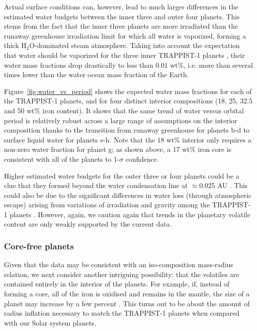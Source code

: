\documentclass[twocolumn]{aastex63}
\begin{document}
Actual surface conditions can, however, lead to much larger differences in the estimated water budgets between the inner three and outer four planets. This stems from the fact that the inner three planets are more irradiated than the runaway greenhouse irradiation limit \citep{Kopparapu2013,Wolf2017,Turbet2018} for which all water is vaporized, forming a thick H$_2$O-dominated steam atmosphere. Taking into account the expectation that water should be vaporized for the three inner TRAPPIST-1 planets \citep{Turbet2019,Turbet2020}, their water mass fractions drop drastically to less than $0.01$ wt\%, i.e. more than several times lower than the water ocean mass fraction of the Earth.

Figure~\ref{fig:water_vs_period} shows the expected water mass fractions for each of the TRAPPIST-1 planets, and for four distinct interior compositions (18, 25, 32.5 and 50 wt\% iron content). It shows that the same trend of water versus orbital period is relatively robust across a large range of assumptions on the interior composition thanks to the transition from runaway greenhouse for planets b-d to surface liquid water for planets e-h.  Note that the 18 wt\% interior only requires a non-zero water fraction for planet g;  as shown above, a 17 wt\% iron core is consistent with all of the planets to 1-$\sigma$ confidence.

Higher estimated water budgets for the outer three or four planets could be a clue that they formed beyond the water condensation line at $\approx$0.025 AU \citep{Unterborn2018a}. This could also be due to the significant differences in water loss (through atmospheric escape) arising from variations of irradiation and gravity among the TRAPPIST-1 planets \citep{Lissauer2007, Bolmont2017,Bourrier2017}.  However, again, we caution again that trends in the planetary volatile content are only weakly supported by the current data.

\subsubsection{Core-free planets} \label{sec:core_free}

Given that the data may be consistent with an iso-composition mass-radius relation, we next consider another intriguing possibility:
that the volatiles are contained entirely in the interior of the planets.  For example, if, instead of forming a core, all of the iron is oxidised and remains in the mantle, the size of a planet may increase by a few percent \citep{ElkinsTanton2008}.  This turns out to be about the amount of radius inflation necessary to match the TRAPPIST-1 planets when compared with our Solar system planets.
\end{document}
